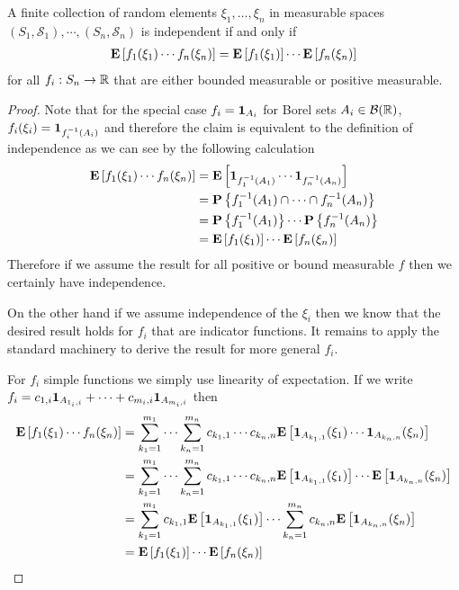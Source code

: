 \begin{lem}\label{IndependenceExpectations}A
  finite collection of random elements $\xi_1, \dots, \xi_n$ in
  measurable spaces $(S_1,\mathcal{S}_1), \cdots, (S_n,
  \mathcal{S}_n)$ is
  independent if and only if 
\begin{align*}
\textbf{E}\left[f_1(\xi_1) \cdots f_n(\xi_n)\right] =
  \textbf{E}\left[f_1(\xi_1)\right] \cdots \textbf{E}\left[f_n(\xi_n)\right]
\end{align*}
for all $f_i : S_n \to \mathbb{R}$ that are either bounded
measurable or positive measurable.
\end{lem}
\begin{proof}
Note that for the special case $f_i = \textbf{1}_{A_i}$ for 
Borel sets $A_i \in \mathcal{B}(\mathbb{R})$, $f_i(\xi_i) =
\textbf{1}_{f_i^{-1}(A_i)}$ and therefore the claim is equivalent to
the definition of independence as we can see by the following
calculation
\begin{align*}
\textbf{E}\left[f_1(\xi_1) \cdots f_n(\xi_n)\right] &=
\textbf{E}\left[\textbf{1}_{f_1^{-1}(A_1)} \cdots
  \textbf{1}_{f_n^{-1}(A_n)}\right] \\
&= \textbf{P}\left \{f_1^{-1}(A_1) \cap \cdots \cap f_n^{-1}(A_n) \right \} \\
&= \textbf{P}\left \{f_1^{-1}(A_1)  \right \} \cdots \textbf{P}\left \{f_n^{-1}(A_n) \right \} \\
&=\textbf{E}\left[f_1(\xi_1)\right] \cdots \textbf{E}\left[f_n(\xi_n)\right]
\end{align*}
Therefore if we assume the result for all positive or bound measurable
$f$ then we certainly have independence.  

On the other hand if we assume independence of the $\xi_i$ then we
know that the desired result holds for $f_i$ that are indicator
functions.  It remains to apply the standard machinery to derive the
result for more general $f_i$.

For $f_i$ simple functions we simply use linearity of expectation.  If
we write $f_i = c_{1,i} \textbf{1}_{A _{1_i,i}} + \cdots + c_{m_i,i}
\textbf{1}_{A _{m_i, i}}$ then 
\begin{align*}
\textbf{E}\left[f_1(\xi_1) \cdots f_n(\xi_n)\right] &= \sum_{k_1 = 1}^{m_1}
\cdots \sum_{k_n = 1}^{m_n} c_{k_1, 1} \cdots c_{k_n, n}
\textbf{E}\left[\textbf{1}_{A_{k_1,1}}(\xi_1)
  \cdots\textbf{1}_{A_{k_n,n}}(\xi_n)\right] \\
&= \sum_{k_1 = 1}^{m_1}
\cdots \sum_{k_n = 1}^{m_n} c_{k_1, 1} \cdots c_{k_n, n}
\textbf{E}\left[\textbf{1}_{A_{k_1,1}}(\xi_1)\right] \cdots
\textbf{E}\left[\textbf{1}_{A_{k_n,n}}(\xi_n)\right] \\
&= \sum_{k_1 = 1}^{m_1} c_{k_1, 1} \textbf{E}\left[\textbf{1}_{A_{k_1,1}}(\xi_1)\right] 
\cdots \sum_{k_n = 1}^{m_n} c_{k_n, n}
\textbf{E}\left[\textbf{1}_{A_{k_n,n}}(\xi_n)\right] \\
&=\textbf{E}\left[f_1(\xi_1)\right] \cdots \textbf{E}\left[f_n(\xi_n)\right]
\end{align*}


\end{proof}
